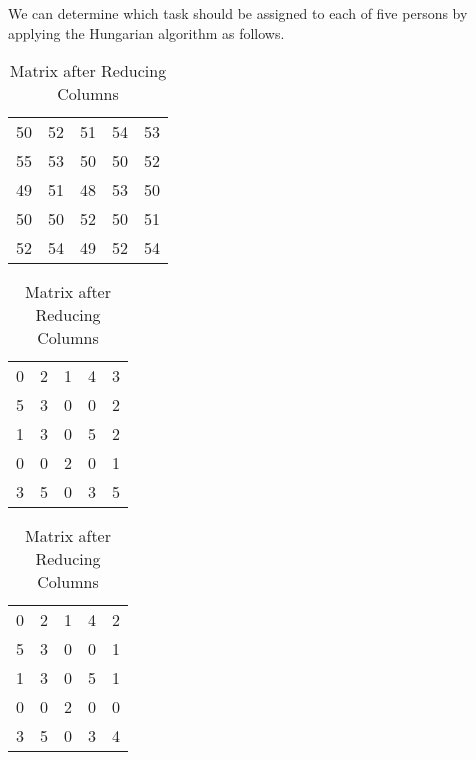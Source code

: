 \begin{subquestions}
\begin{subsubquestions}
We can determine which task should be assigned to each of five persons by applying the Hungarian algorithm as follows.
\begin{table}[H]
	\begin{minipage}{0.3\textwidth}
		\centering
		\begin{tabular}{ccccc}
			50 & 52 & 51 & 54 & 53 \\
		    55 & 53 & 50 & 50 & 52 \\
			49 & 51 & 48 & 53 & 50 \\
			50 & 50 & 52 & 50 & 51 \\
			52 & 54 & 49 & 52 & 54 \\
		\end{tabular}
		\captionsetup{width=1.1\linewidth}
		\caption*{Matrix From question}
	\end{minipage}
	\hspace{20pt}
	\begin{minipage}{0.3\textwidth}
		\centering
		\begin{tabular}{ccccc}
			0 & 2 & 1 & 4 & 3 \\
			5 & 3 & 0 & 0 & 2 \\
			1 & 3 & 0 & 5 & 2 \\
			0 & 0 & 2 & 0 & 1 \\
			3 & 5 & 0 & 3 & 5 \\
		\end{tabular}
		\captionsetup{width=1.1\linewidth}
		\caption*{Matrix after Reducing Rows}
	\end{minipage}
	\hspace{20pt}
	\begin{minipage}{0.3\textwidth}
		\centering
		\begin{tabular}{ccccc}
			0 & 2 & 1 & 4 & 2 \\
			5 & 3 & 0 & 0 & 1 \\
			1 & 3 & 0 & 5 & 1 \\
			0 & 0 & 2 & 0 & 0 \\
			3 & 5 & 0 & 3 & 4 \\
		\end{tabular}
		\captionsetup{width=1.1\linewidth}
		\caption*{Matrix after Reducing Columns} 
	\end{minipage}
	\vspace{20pt} 
	\begin{minipage}{0.3\textwidth}

\end{minipage}
\end{table}
\end{subsubquestions}
\end{subquestions}
